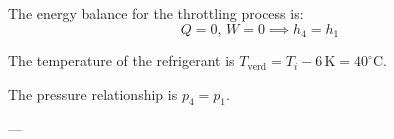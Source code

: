 The energy balance for the throttling process is:  
\[
Q = 0, \, W = 0 \implies h_4 = h_1
\]  

The temperature of the refrigerant is \( T_{\text{verd}} = T_i - 6 \, \text{K} = 40^\circ\text{C} \).  

The pressure relationship is \( p_4 = p_1 \).  

---
